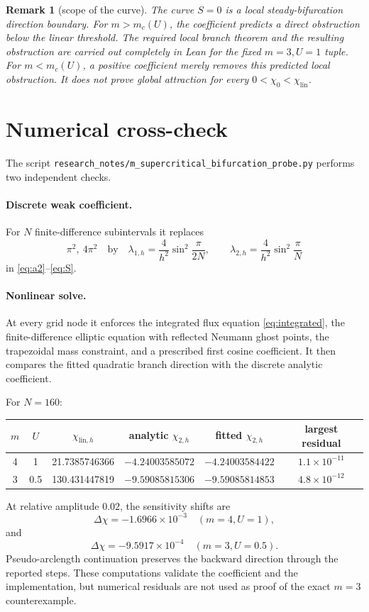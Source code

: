 \documentclass[11pt]{article}
\newcommand{\code}[1]{\nolinkurl{#1}}
\newtheorem{remark}{Remark}
\begin{document}
\begin{remark}[scope of the curve]
The curve \(S=0\) is a local steady-bifurcation direction boundary.  For
\(m>m_c(U)\), the coefficient predicts a direct obstruction below the linear
threshold.  The required local branch theorem and the resulting obstruction
are carried out completely in Lean for the fixed \(m=3,U=1\) tuple.  For
\(m<m_c(U)\), a positive coefficient merely removes this predicted local
obstruction.  It does not prove global attraction for every
\(0<\chi_0<\chi_{\mathrm{lin}}\).
\end{remark}

\section{Numerical cross-check}

The script \code{research_notes/m_supercritical_bifurcation_probe.py}
performs two independent checks.

\paragraph{Discrete weak coefficient.}
For \(N\) finite-difference subintervals it replaces
\[
 \pi^2,\ 4\pi^2
\quad\text{by}\quad
 \lambda_{1,h}=\frac4{h^2}\sin^2\frac{\pi}{2N},\qquad
 \lambda_{2,h}=\frac4{h^2}\sin^2\frac{\pi}{N}
\]
in \eqref{eq:a2}--\eqref{eq:S}.

\paragraph{Nonlinear solve.}
At every grid node it enforces the integrated flux equation
\eqref{eq:integrated}, the finite-difference elliptic equation with reflected
Neumann ghost points, the trapezoidal mass constraint, and a prescribed first
cosine coefficient.  It then compares the fitted quadratic branch direction
with the discrete analytic coefficient.

For \(N=160\):
\begin{center}
\small
\renewcommand{\arraystretch}{1.15}
\begin{tabular}{@{}cccccc@{}}
\toprule
\(m\)&\(U\)&\(\chi_{\mathrm{lin},h}\)&analytic \(\chi_{2,h}\)&fitted
\(\chi_{2,h}\)&largest residual\\
\midrule
4&1&21.7385746366&\(-4.24003585072\)&\(-4.24003584422\)&\(1.1\times10^{-11}\)\\
3&0.5&130.431447819&\(-9.59085815306\)&\(-9.59085814853\)&\(4.8\times10^{-12}\)\\
\bottomrule
\end{tabular}
\end{center}
At relative amplitude \(0.02\), the sensitivity shifts are
\[
 \Delta\chi=-1.6966\times10^{-3}\quad(m=4,U=1),
\]
and
\[
 \Delta\chi=-9.5917\times10^{-4}\quad(m=3,U=0.5).
\]
Pseudo-arclength continuation preserves the backward direction through the
reported steps.  These computations validate the coefficient and the
implementation, but numerical residuals are not used as proof of the exact
\(m=3\) counterexample.
\end{document}
